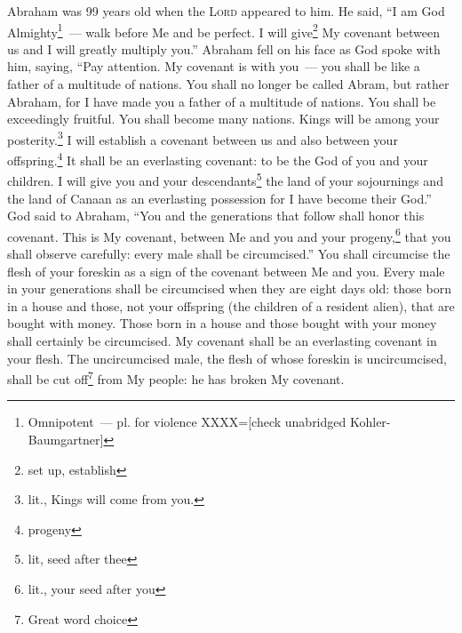 
\begin{inparaenum}
     Abraham was 99 years old when the \textsc{Lord} appeared to him. He said, ``I am God Almighty\footnote{Omnipotent~--- pl. for violence XXXX=[check unabridged Kohler-Baumgartner]}~--- walk before Me and be perfect.%
     I will give\footnote{set up, establish} My covenant between us and I will greatly multiply you.''%
     Abraham fell on his face as God spoke with him, saying,%
     ``Pay attention. My covenant is with you~--- you shall be like a father of a multitude of nations.%
     You shall no longer be called Abram, but rather Abraham, for I have made you a father of a multitude of nations.%
     You shall be exceedingly fruitful. You shall become many nations. Kings will be among your posterity.\footnote{lit., Kings will come from you.}%
     I will establish a covenant between us and also between your offspring.\footnote{progeny} It shall be an everlasting covenant: to be the God of you and your children.%
     I will give you and your descendants\footnote{lit, seed after thee} the land of your sojournings and the land of Canaan as an everlasting possession for I have become their God.''%
     God said to Abraham, ``You and the generations that follow shall honor this covenant.%
     This is My covenant, between Me and you and your progeny,\footnote{lit., your seed after you} that you shall observe carefully: every male shall be circumcised.''%
     You shall circumcise the flesh of your foreskin as a sign of the covenant between Me and you.%
     Every male in your generations shall be circumcised when they are eight days old: those born in a house and those, not your offspring (the children of a resident alien), that are bought with money.%
     Those born in a house and those bought with your money shall certainly be circumcised. My covenant shall be an everlasting covenant in your flesh.%
     The uncircumcised male, the flesh of whose foreskin is uncircumcised, shall be cut off\footnote{Great word choice} from My people: he has broken My covenant.%

\end{inparaenum}
